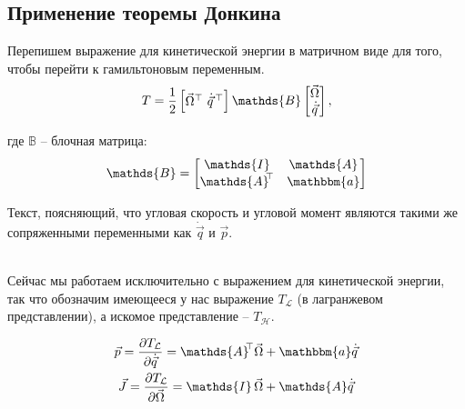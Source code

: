 \documentclass[12pt]{article}
\newcommand{\bbA}{\mathds{A}}
\newcommand{\bbI}{\mathds{I}}
\newcommand{\bbB}{\mathds{B}}
\newcommand{\bba}{\mathbbm{a}}
\newcommand{\dn}{\! \!} %
\begin{document}
\subsection{Применение теоремы Донкина}
Перепишем выражение для кинетической энергии в матричном виде для того, чтобы перейти к гамильтоновым переменным.
\begin{gather}
T = \frac{1}{2} 
\begin{bmatrix}
\vec{\Omega}^{\top} \ \dot{\vec{q}}^{\, \top}
\end{bmatrix}
\bbB
\begin{bmatrix}
\vec{\Omega} \\
\dot{\vec{q}}
\end{bmatrix}, \notag
\end{gather}

где $\bbB$ -- блочная матрица:
\begin{gather}
\bbB = 
\begin{bmatrix}
\bbI & \bbA \\
\bbA^{\dn \top} & \bba
\end{bmatrix} \notag
\end{gather}  

\begin{minipage}[c]{0.55\linewidth}
\end{minipage}
\begin{minipage}[c]{0.4\linewidth}
Текст, поясняющий, что угловая скорость и угловой момент являются такими же сопряженными переменными как $\dot{\vec{q}}$ и $\vec{p}$.
\end{minipage} \\

Сейчас мы работаем исключительно с выражением для кинетической энергии, так что обозначим имеющееся у нас выражение $T_\mathcal{L}$ (в лагранжевом представлении), а искомое представление -- $T_\mathcal{H}$.

\begin{gather}
\vec{p} = \frac{\partial T_\mathcal{L}}{\partial \dot{\vec{q}}} = \bbA^{\dn \top} \vec{\Omega} + \bba \dot{\vec{q}} \notag \\
\vec{J} = \frac{\partial T_\mathcal{L}}{\partial \vec{\Omega}} = \bbI \, \vec{\Omega} + \bbA \dot{\vec{q}} \notag
\end{gather}
\end{document}
